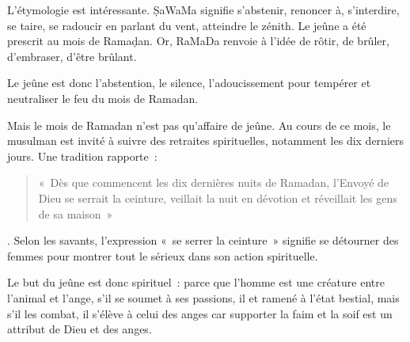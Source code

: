 



L'étymologie est intéressante. ṢaWaMa signifie s'abstenir, renoncer à,
s'interdire, se taire, se radoucir en parlant du vent, atteindre le
zénith. Le jeûne a été prescrit au mois de Ramaḍan. Or, RaMaDa renvoie à
l'idée de rôtir, de brûler, d'embraser, d'être brûlant.

\begin{Def}[jeûne]
Le jeûne est donc l'abstention, le silence, l'adoucissement pour
tempérer et neutraliser le feu du mois de Ramadan.
\end{Def}

Mais le mois de Ramadan n'est pas qu'affaire de jeûne. Au cours de ce
mois, le musulman est invité à suivre des retraites spirituelles,
notamment les dix derniers jours. Une tradition rapporte~:
\begin{quote}
    «~Dès que
commencent les dix dernières nuits de Ramadan, l'Envoyé de Dieu se
serrait la ceinture, veillait la nuit en dévotion et réveillait les gens
de sa maison~»
\end{quote}. Selon les savants, l'expression «~se serrer la
ceinture~» signifie se détourner des femmes pour montrer tout le sérieux
dans son action spirituelle.

Le but du jeûne est donc spirituel~: parce que l'homme est une créature
entre l'animal et l'ange, s'il se soumet à ses passions, il et ramené à
l'état bestial, mais s'il les combat, il s'élève à celui des anges car
supporter la faim et la soif est un attribut de Dieu et des anges.

